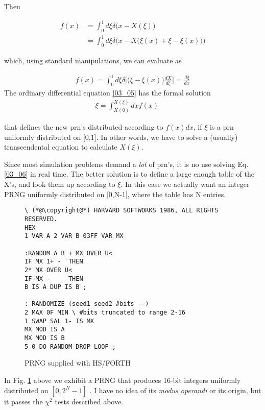 Then

\begin{align}
    f(x) &= \int_{0}^{1}d\xi\delta \Big(x-X(\xi)\Big)\nonumber \\
    &= \int_{0}^{1}d\xi\delta \Big(x-X\Big(\xi(x)+\xi-\xi(x)\Big)\Big)
\end{align}

which, using standard manipulations, we can evaluate as

\begin{eqnarray} 
    f(x)=\int_{0}^{1}d\xi\delta \Big[\Big(\xi-\xi(x)\Big)\frac{dX}{d\xi}\Big]=\frac{d\xi}{dx} \label{03_05}
\end{eqnarray} 
The ordinary differential equation \ref{03_05} has the formal solution
\begin{eqnarray} 
    \xi=\int_{X(0)}^{X(\xi)}dx f(x) \label{03_06} &&
\end{eqnarray} 

that defines the new prn's distributed according to $f(x)dx$, if $\xi$ is a
prn uniformly distributed on [0,1]. In other words, we have to
solve a (usually) transcendental equation to calculate $X(\xi)$.

Since most simulation problems demand a \textit{lot} of prn's, it is no use
solving Eq. \ref{03_06} in real time. The better solution is to define a large
enough table of the X's, and look them up according to $\xi$. In this
case we actually want an integer PRNG uniformly distributed on
[0,N-1], where the table has N entries.

\begin{figure}
    \label{fig:03_03}
    \begin{mdframed}
        \begin{lstlisting}
\ (*@\copyright@*) HARVARD SOFTWORKS 1986, ALL RIGHTS RESERVED.
HEX
1 VAR A 2 VAR B 03FF VAR MX

:RANDOM A B + MX OVER U<
IF MX 1+ -  THEN
2* MX OVER U<
IF MX -     THEN
B IS A DUP IS B ;

: RANDOMIZE (seed1 seed2 #bits --)
2 MAX 0F MIN \ #bits truncated to range 2-16
1 SWAP SAL 1- IS MX
MX MOD IS A
MX MOD IS B
5 0 DO RANDOM DROP LOOP ;
        \end{lstlisting}
    \end{mdframed}
    \caption{PRNG supplied with HS/FORTH}
\end{figure}

In Fig. \ref{fig:03_03}  above we exhibit a PRNG that produces 16-bit integers
uniformly distributed on $[0, 2^N-1]$ . I have no idea of its \textit{modus
operandi} or its origin, but it passes the $\chi^2$ tests described above.


